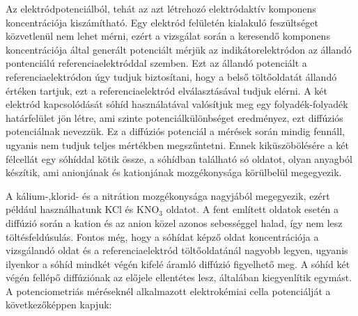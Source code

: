 Az elektródpotenciálból, tehát az azt létrehozó elektródaktív komponens koncentrációja kiszámítható. Egy elektród felületén kialakuló feszültséget közvetlenül nem lehet mérni, ezért a vizsgálat során a keresendő komponens koncentrációja által generált potenciált mérjük az indikátorelektródon az állandó pontenciálú referenciaelektróddal szemben. Ezt az állandó potenciált a referenciaelektródon úgy tudjuk biztosítani, hogy a belső töltőoldatát állandó értéken tartjuk, ezt a referenciaelektród elválasztásával tudjuk elérni. A két elektród kapcsolódását sóhíd használatával valósítjuk meg egy folyadék-folyadék határfelület jön létre, ami szinte potenciálkülönbséget eredményez, ezt diffúziós potenciálnak nevezzük. Ez a diffúziós potenciál a mérések során mindig fennáll, ugyanis nem tudjuk teljes mértékben megszűntetni. Ennek kiküszöbölésére a két félcellát egy sóhíddal kötik össze, a sóhídban található só oldatot, olyan anyagból készítik, ami anionjának és kationjának mozgékonysága körülbelül megegyezik.


A kálium-,klorid- és a nitrátion mozgékonysága nagyjából megegyezik, ezért például használhatunk KCl és KNO$_3$ oldatot.
A fent említett oldatok esetén a diffúzió során a kation és az anion közel azonos sebességgel halad, így nem lesz töltésfeldúsulás. Fontos még, hogy a sóhídat képző oldat koncentrációja a vizsgálandó oldat és a referenciaelektród töltőoldatánál nagyobb legyen, ugyanis ilyenkor a sóhíd mindkét végén kifelé áramló diffúzió figyelhető meg. A sóhíd két végén fellépő diffúziónak az előjele ellentétes lesz, általában kiegyenlítik egymást. A potenciometriás méréseknél alkalmazott elektrokémiai cella potenciálját a következőképpen kapjuk:


